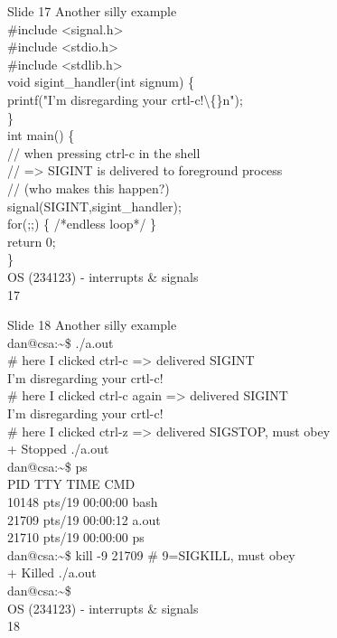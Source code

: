 \documentclass{beamer}
\begin{document}
\begin{frame}{Slide 17}
Another silly example\\\#include <signal.h>\\\#include <stdio.h>\\\#include <stdlib.h>\\void sigint\_handler(int signum) \{\\    printf("I’m disregarding your crtl-c!\textbackslash\{\}n");\\\}\\int main() \{\\    // when pressing ctrl-c in the shell \\    // => SIGINT is delivered to foreground process\\    // (who makes this happen?)\\    signal(SIGINT,sigint\_handler); \\    for(;;) \{ /*endless loop*/ \}\\    return 0;\\\}\\OS (234123) - interrupts \& signals\\17
\end{frame}
\begin{frame}{Slide 18}
Another silly example\\<0>dan@csa:\textasciitilde{}\$ ./a.out \\\# here I clicked ctrl-c => delivered SIGINT\\I’m disregarding your crtl-c!\\\# here I clicked ctrl-c again => delivered SIGINT\\I’m disregarding your crtl-c!\\\# here I clicked ctrl-z => delivered SIGSTOP, must obey\\[1]+  Stopped                 ./a.out\\<148>dan@csa:\textasciitilde{}\$ ps\\  PID TTY          TIME CMD\\10148 pts/19   00:00:00 bash\\21709 pts/19   00:00:12 a.out\\21710 pts/19   00:00:00 ps\\<0>dan@csa:\textasciitilde{}\$ kill -9 21709   \# 9=SIGKILL, must obey\\[1]+  Killed                  ./a.out\\<0>dan@csa:\textasciitilde{}\$\\OS (234123) - interrupts \& signals\\18
\end{frame}
\end{document}
